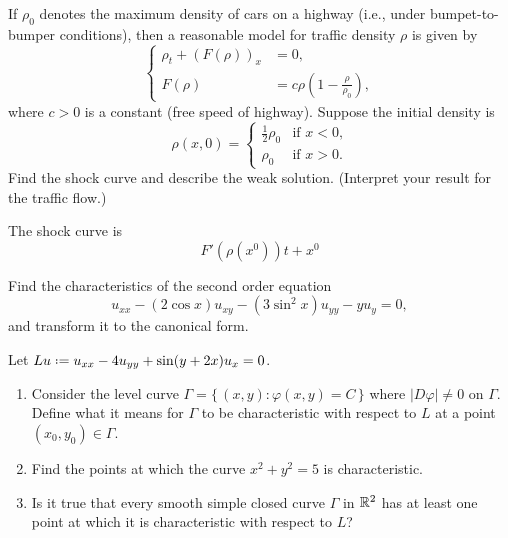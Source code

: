 \begin{problem}
  If \(\rho_0\) denotes the maximum density of cars on a highway (i.e.,
  under bumpet-to-bumper conditions), then a reasonable model for traffic
  density \(\rho\) is given by
  \[
     \left\{
       \begin{aligned}
         \rho_t+(F(\rho))_x&=0,\\
         F(\rho)&=c\rho\left(1-\frac{\rho}{\rho_0}\right),
      \end{aligned}
    \right.
  \]
  where \(c>0\) is a constant (free speed of highway). Suppose the initial
  density is
  \[
    \rho(x,0)=
    \begin{cases}
      \frac{1}{2}\rho_0&\text{if \(x<0\),}\\
      \rho_0&\text{if \(x>0\).}
    \end{cases}
  \]
  Find the shock curve and describe the weak solution. (Interpret your
  result for the traffic flow.)
\end{problem}
\begin{solution*}
  The shock curve is
  \[
    F'(\rho(x^0))t+x^0
  \]
\end{solution*}

\begin{problem}
  Find the characteristics of the second order equation
  \[
    u_{xx}-(2\cos x)u_{xy}-(3\sin^2 x)u_{yy}-yu_y=0,
  \]
  and transform it to the canonical form.
\end{problem}
\begin{solution*}
\end{solution*}

\begin{problem}
  Let \(Lu\defeq u_{xx}-4u_{yy}+\sin(y+2x)u_{x}=0\).
  \begin{enumerate}[label=(\alph*),noitemsep]
  \item Consider the level curve \(\Gamma=\{\,(x,y):\varphi(x,y)=C\,\}\)
    where \(|D\varphi|\neq 0\) on \(\Gamma\). Define what it means for
    \(\Gamma\) to be characteristic with respect to \(L\) at a point
    \((x_0,y_0)\in\Gamma\).
  \item Find the points at which the curve \(x^2+y^2=5\) is
    characteristic.
  \item Is it true that every smooth simple closed curve \(\Gamma\) in
    \(\mathbb{R}^2\) has at least one point at which it is characteristic with
    respect to \(L\)?
  \end{enumerate}
\end{problem}
\begin{solution*}
\end{solution*}

